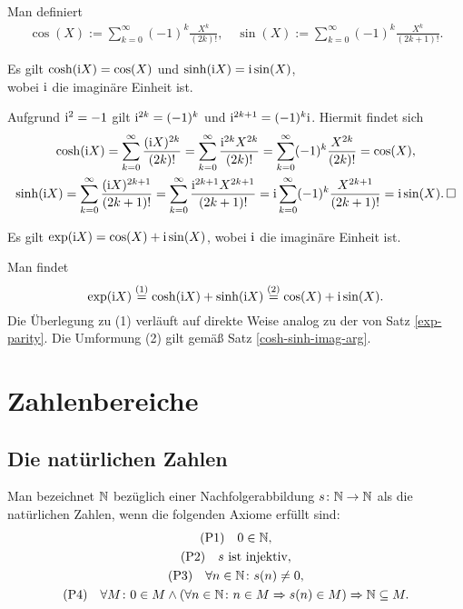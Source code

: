 \newpage
\begin{Definition} Man definiert
\begin{gather*}
\cos(X) := \sum_{k=0}^\infty (-1)^k\frac{X^k}{(2k)!},\quad
\sin(X) := \sum_{k=0}^\infty (-1)^k\frac{X^k}{(2k+1)!}.
\end{gather*}
\end{Definition}

\begin{Satz}\label{cosh-sinh-imag-arg}
Es gilt $\cosh(\mathrm i X) = \cos(X)$ und $\sinh(\mathrm i X) = \mathrm i\sin(X)$,\\
wobei $\mathrm i$ die imaginäre Einheit ist.
\end{Satz}
\begin{Beweis}
Aufgrund $\mathrm i^2=-1$ gilt $\mathrm i^{2k} = (-1)^k$ und $\mathrm i^{2k+1} = (-1)^k\mathrm i$.
Hiermit findet sich
\begin{gather*}
\cosh(\mathrm i X) = \sum_{k=0}^\infty\frac{(\mathrm i X)^{2k}}{(2k)!}
= \sum_{k=0}^\infty\frac{\mathrm i^{2k} X^{2k}}{(2k)!}
= \sum_{k=0}^\infty (-1)^k\frac{X^{2k}}{(2k)!} = \cos(X),\\
\sinh(\mathrm i X) = \sum_{k=0}^\infty\frac{(\mathrm i X)^{2k+1}}{(2k+1)!}
= \sum_{k=0}^\infty\frac{\mathrm i^{2k+1} X^{2k+1}}{(2k+1)!}
= \mathrm i\sum_{k=0}^\infty (-1)^k\frac{X^{2k+1}}{(2k+1)!}
= \mathrm i\sin(X).\,\square
\end{gather*}
\end{Beweis}

\begin{Satz}\newlinefirst
Es gilt $\exp(\mathrm i X) = \cos(X)+\mathrm i\sin(X)$, wobei $\mathrm i$ die
imaginäre Einheit ist.
\end{Satz}
\begin{Beweis}
Man findet
\[\exp(\mathrm i X) \stackrel{\text{(1)}}= \cosh(\mathrm i X) + \sinh(\mathrm i X)
\stackrel{\text{(2)}}= \cos(X)+\mathrm i\sin(X).\]
Die Überlegung zu (1) verläuft auf direkte Weise analog zu der von
Satz \ref{exp-parity}. Die Umformung (2) gilt gemäß Satz
\ref{cosh-sinh-imag-arg}.\,\qedsymbol
\end{Beweis}

\section{Zahlenbereiche}

\subsection{Die natürlichen Zahlen}

\begin{Definition}\newlinefirst
Man bezeichnet $\mathbb N$ bezüglich einer Nachfolgerabbildung $s\colon\mathbb N\to\mathbb N$
als die natürlichen Zahlen, wenn die folgenden Axiome erfüllt sind:
\begin{gather*}
\text{(P1)}\quad 0\in\mathbb N,\\
\text{(P2)}\quad \text{$s$ ist injektiv},\\
\text{(P3)}\quad \forall n\in\mathbb N\colon s(n)\ne 0,\\
\text{(P4)}\quad \forall M\colon 0\in M\land (\forall n\in\mathbb N\colon n\in M\Rightarrow s(n)\in M)\Rightarrow \mathbb N\subseteq M.
\end{gather*}
\end{Definition}

